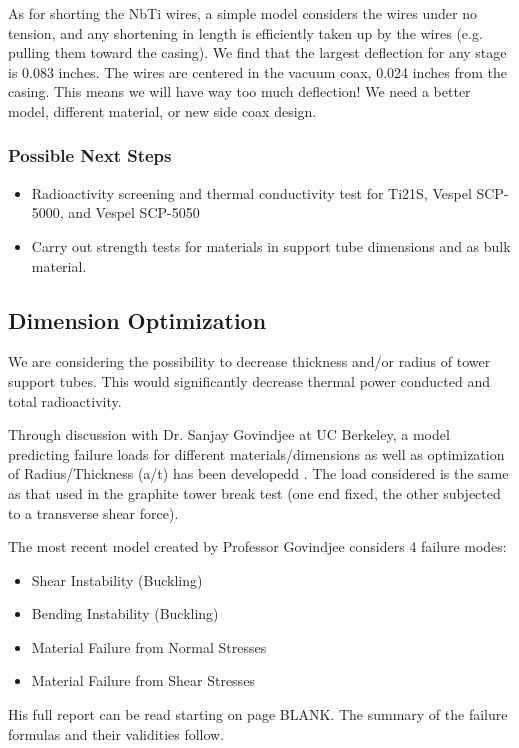 \documentclass{report}
\begin{document}
\begin{multicols}{2}
As for shorting the NbTi wires, a simple model considers the wires under no tension, and any shortening in length is efficiently taken up by the wires (e.g. pulling them toward
the casing). We find that the largest deflection for any stage is 0.083 inches. The wires are centered in the vacuum coax, 0.024 inches from the casing. This means we will have way too much deflection! We need a better model, different material, or new side coax design.

\subsubsection{Possible Next Steps}
\begin{itemize}
\item Radioactivity screening and thermal conductivity test for Ti21S, Vespel SCP-5000, and Vespel SCP-5050
\item Carry out strength tests for materials in support tube dimensions and as bulk material.
\end{itemize}

\subsection{Dimension Optimization}
 We are considering the possibility to decrease thickness and/or radius of tower support tubes. This would significantly decrease thermal power conducted and total radioactivity.

Through discussion with Dr. Sanjay Govindjee at UC Berkeley, a model predicting failure loads for different materials/dimensions as well as optimization of Radius/Thickness (a/t) has been developedd . The load considered is the same as that used in the graphite tower break test (one end fixed, the other subjected to a transverse shear force).

The most recent model created by Professor Govindjee considers 4 failure modes:
\begin{itemize}
\item Shear Instability (Buckling)
\item Bending Instability (Buckling)
\item Material Failure from Normal Stresses
\item Material Failure from Shear Stresses
\end{itemize}

His full report can be read starting on page {\huge BLANK}. The summary of the failure formulas and their validities follow.


\end{multicols}
\end{document}
